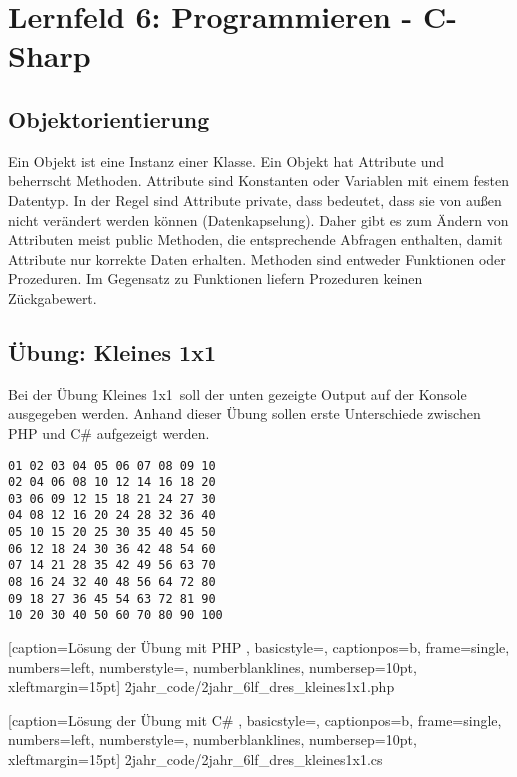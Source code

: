 \section{Lernfeld 6: Programmieren - C-Sharp}

\subsection{Objektorientierung}

Ein Objekt ist eine Instanz einer Klasse. Ein Objekt hat Attribute und beherrscht Methoden. Attribute sind Konstanten oder Variablen mit einem festen Datentyp. In der Regel sind Attribute private, dass bedeutet, dass sie von außen nicht verändert werden können (Datenkapselung). Daher gibt es zum Ändern von Attributen meist public Methoden, die entsprechende Abfragen enthalten, damit Attribute nur korrekte Daten erhalten. Methoden sind entweder Funktionen oder Prozeduren. Im Gegensatz zu Funktionen liefern Prozeduren keinen Zückgabewert.

\subsection{Übung: Kleines 1x1}

Bei der Übung \ql Kleines 1x1\qr\ soll der unten gezeigte Output auf der Konsole ausgegeben werden. Anhand dieser Übung sollen erste Unterschiede zwischen PHP und C\# aufgezeigt werden.

\begin{lstlisting}
01 02 03 04 05 06 07 08 09 10 
02 04 06 08 10 12 14 16 18 20 
03 06 09 12 15 18 21 24 27 30 
04 08 12 16 20 24 28 32 36 40 
05 10 15 20 25 30 35 40 45 50 
06 12 18 24 30 36 42 48 54 60 
07 14 21 28 35 42 49 56 63 70 
08 16 24 32 40 48 56 64 72 80 
09 18 27 36 45 54 63 72 81 90 
10 20 30 40 50 60 70 80 90 100
\end{lstlisting}


	[caption={Lösung der Übung mit PHP}
	\label{lst:6lf_dres_kleines1x1.php},
	basicstyle=\small,
	captionpos=b,
	frame=single,
	numbers=left,
	numberstyle=\small,
	numberblanklines,
	numbersep=10pt,
	xleftmargin=15pt]
	{2jahr_code/2jahr_6lf_dres_kleines1x1.php}
\newpage

	[caption={Lösung der Übung mit C\#}
	\label{lst:6lf_dres_kleines1x1.cs},
	basicstyle=\small,
	captionpos=b,
	frame=single,
	numbers=left,
	numberstyle=\small,
	numberblanklines,
	numbersep=10pt,
	xleftmargin=15pt]
	{2jahr_code/2jahr_6lf_dres_kleines1x1.cs}

